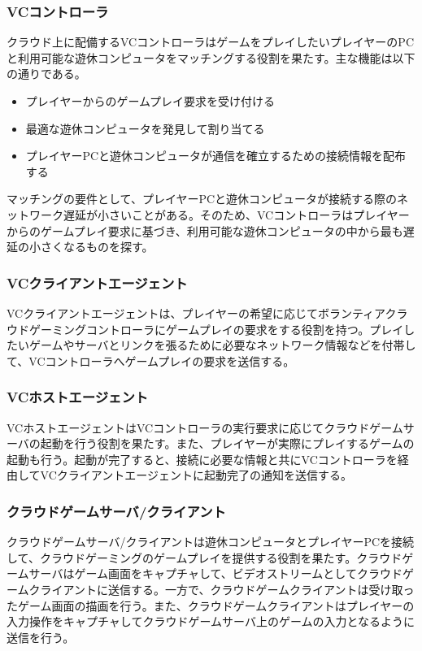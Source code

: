 \subsubsection{VCコントローラ}
クラウド上に配備するVCコントローラはゲームをプレイしたいプレイヤーのPCと利用可能な遊休コンピュータをマッチングする役割を果たす。主な機能は以下の通りである。
\begin{itemize}
    \item プレイヤーからのゲームプレイ要求を受け付ける
    \item 最適な遊休コンピュータを発見して割り当てる
    \item プレイヤーPCと遊休コンピュータが通信を確立するための接続情報を配布する
\end{itemize}
マッチングの要件として、プレイヤーPCと遊休コンピュータが接続する際のネットワーク遅延が小さいことがある。そのため、VCコントローラはプレイヤーからのゲームプレイ要求に基づき、利用可能な遊休コンピュータの中から最も遅延の小さくなるものを探す。


\subsubsection{VCクライアントエージェント}
VCクライアントエージェントは、プレイヤーの希望に応じてボランティアクラウドゲーミングコントローラにゲームプレイの要求をする役割を持つ。プレイしたいゲームやサーバとリンクを張るために必要なネットワーク情報などを付帯して、VCコントローラへゲームプレイの要求を送信する。

\subsubsection{VCホストエージェント}
VCホストエージェントはVCコントローラの実行要求に応じてクラウドゲームサーバの起動を行う役割を果たす。また、プレイヤーが実際にプレイするゲームの起動も行う。起動が完了すると、接続に必要な情報と共にVCコントローラを経由してVCクライアントエージェントに起動完了の通知を送信する。

\subsubsection{クラウドゲームサーバ/クライアント}
クラウドゲームサーバ/クライアントは遊休コンピュータとプレイヤーPCを接続して、クラウドゲーミングのゲームプレイを提供する役割を果たす。クラウドゲームサーバはゲーム画面をキャプチャして、ビデオストリームとしてクラウドゲームクライアントに送信する。一方で、クラウドゲームクライアントは受け取ったゲーム画面の描画を行う。また、クラウドゲームクライアントはプレイヤーの入力操作をキャプチャしてクラウドゲームサーバ上のゲームの入力となるように送信を行う。

